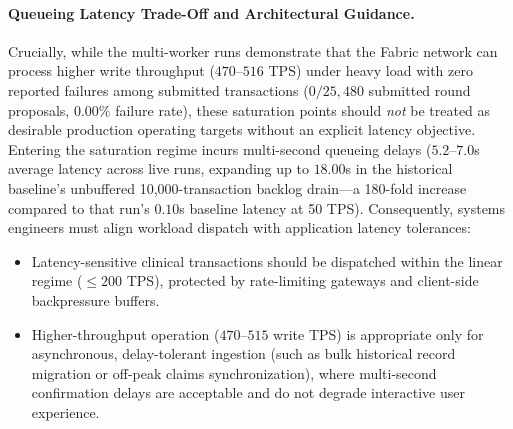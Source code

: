\documentclass[runningheads]{llncs}
\begin{document}
\paragraph{Queueing Latency Trade-Off and Architectural Guidance.}
Crucially, while the multi-worker runs demonstrate that the Fabric network can process higher write throughput ($470$--$516$ TPS) under heavy load with zero reported failures among submitted transactions ($0/25,480$ submitted round proposals, $0.00\%$ failure rate), these saturation points should \textit{not} be treated as desirable production operating targets without an explicit latency objective. Entering the saturation regime incurs multi-second queueing delays ($5.2$--$7.0$s average latency across live runs, expanding up to $18.00$s in the historical baseline's unbuffered 10,000-transaction backlog drain---a 180-fold increase compared to that run's $0.10$s baseline latency at 50 TPS). Consequently, systems engineers must align workload dispatch with application latency tolerances:
\begin{itemize}
    \item Latency-sensitive clinical transactions should be dispatched within the linear regime ($\le 200$ TPS), protected by rate-limiting gateways and client-side backpressure buffers.
    \item Higher-throughput operation ($470$--$515$ write TPS) is appropriate only for asynchronous, delay-tolerant ingestion (such as bulk historical record migration or off-peak claims synchronization), where multi-second confirmation delays are acceptable and do not degrade interactive user experience.
\end{itemize}
\end{document}
